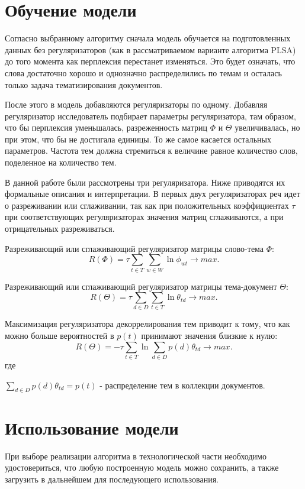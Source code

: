 %
\section{Обучение модели}

Согласно выбранному алгоритму сначала модель обучается на подготовленных данных без регуляризаторов (как в рассматриваемом варианте алгоритма PLSA) до того момента как перплексия перестанет изменяться. Это будет означать, что слова достаточно хорошо и однозначно распределились по темам и осталась только задача тематизирования документов.

После этого в модель добавляются регуляризаторы по одному. Добавляя регуляризатор исследователь подбирает параметры регуляризатора, там образом, что бы перплексия уменьшалась, разреженность матриц $\Phi$ и $\Theta$ увеличивалась, но при этом, что бы не достигала единицы. То же самое касается остальных параметров. Частота тем должна стремиться к величине равное количество слов, поделенное на количество тем.

В данной работе были рассмотрены три регуляризатора. Ниже приводятся их формальные описания и интерпретации. В первых двух регуляризаторах реч идет о разреживании или сглаживании, так как при положительных коэффициентах $\tau$ при соответствующих регуляризаторах значения матриц сглаживаются, а при отрицательных разреживаться.

Разреживающий или сглаживающий регуляризатор матрицы слово-тема $\Phi$:
$$
R(\Phi) = \tau \sum_{t \in T}{ \sum_{w \in W} \ln{ \phi_{wt} }} \rightarrow max.
$$

Разреживающий или сглаживающий регуляризатор матрицы тема-документ $\Theta$:
$$
R(\Theta) = \tau \sum_{d \in D}{ \sum_{t \in T} \ln{ \theta_{td} }} \rightarrow max.
$$

Максимизация регуляризатора декоррелирования тем приводит к тому, что как можно больше вероятностей в $p(t)$ принимают значения близкие к нулю:
$$
R(\Theta) = -\tau \sum_{t \in T}{ \ln{ \sum_{d \in D}{ p(d) \theta_{td} } } } \rightarrow max.
$$
где

$\sum_{d \in D}{ p(d) \theta_{td} } = p(t)$ - распределение тем в коллекции документов.


%
\section{Использование модели}

При выборе реализации алгоритма в технологической части необходимо удостовериться, что любую построенную модель можно сохранить, а также загрузить в дальнейшем для последующего использования.

